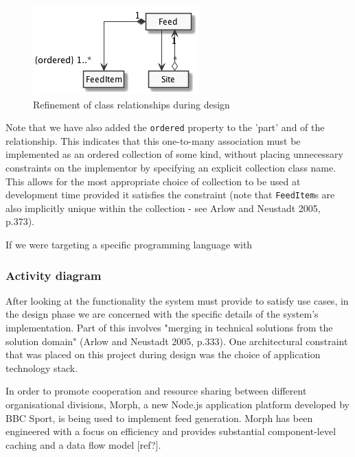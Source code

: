 \documentclass{article}
\begin{document}
\begin{figure}
  \begin{center}
    \includegraphics[width=\textwidth]{design-classes.png}
  \end{center}
  \label{design-classes}
  \caption{Refinement of class relationships during design}
\end{figure}

Note that we have also added the \texttt{ordered} property to the 'part' and of the relationship. This indicates that this one-to-many association must be implemented as an ordered collection of some kind, without placing unnecessary constraints on the implementor by specifying an explicit collection class name. This allows for the most appropriate choice of collection to be used at development time provided it satisfies the constraint (note that \texttt{FeedItem}s are also implicitly unique within the collection - see Arlow and Neustadt 2005, p.373).

If we were targeting a specific programming language with 

\subsubsection{Activity diagram}

After looking at the functionality the system must provide to satisfy use cases, in the design phase we are concerned with the specific details of the system's implementation. Part of this involves "merging in technical solutions from the solution domain" (Arlow and Neustadt 2005, p.333). One architectural constraint that was placed on this project during design was the choice of application technology stack.

In order to promote cooperation and resource sharing between different organisational divisions, Morph, a new Node.js application platform developed by BBC Sport, is being used to implement feed generation. Morph has been engineered with a focus on efficiency and provides substantial component-level caching and a data flow model [ref?].
\end{document}
